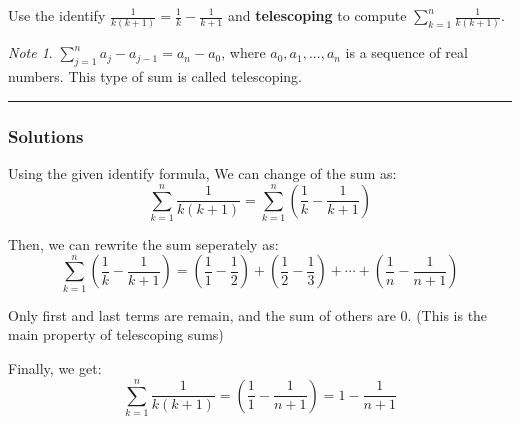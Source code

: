 \newpage
\begin{question}
Use the identify $\displaystyle\frac 1 {k(k+1)} = \frac 1 k - \frac 1 {k+1}$ and \textbf{telescoping} to compute $\displaystyle \sum_{k=1}^{n} \frac 1 {k(k+1)}$.

\theoremstyle{remark}
\newtheorem*{note}{Note}
\begin{note}
$\displaystyle\sum_{j = 1} ^{n} a_{j} - a_{j-1} = a_{n} - a_{0}$, where $a_{0},a_{1},...,a_{n}$ is a sequence of real numbers. This type of sum is called telescoping.
\end{note}
\end{question}

\par\noindent\rule{\textwidth}{0.5pt}

\subsubsection*{Solutions}

Using the given identify formula, We can change of the sum as:
$$\sum_{k=1} ^n \frac 1 {k(k+1)} = \sum _{k=1} ^n \left ( \frac 1 k - \frac 1 {k + 1} \right )$$

\noindent
Then, we can rewrite the sum seperately as:
$$\sum _{k=1} ^n \left ( \frac 1 k - \frac 1 {k + 1} \right ) = \left ( \frac 1 1 - \frac 1 2 \right ) + \left ( \frac 1 2 - \frac 1 3 \right ) + \cdots + \left ( \frac 1 n - \frac 1 {n+1} \right )$$

\noindent
Only first and last terms are remain, and the sum of others are $0$. (This is the main property of telescoping sums)

\noindent
Finally, we get:
$$\sum _{k=1} ^n \frac 1 {k(k+1)} = \left ( \frac 1 1 - \frac 1 {n+1} \right ) = 1 - \frac 1 {n+1}$$